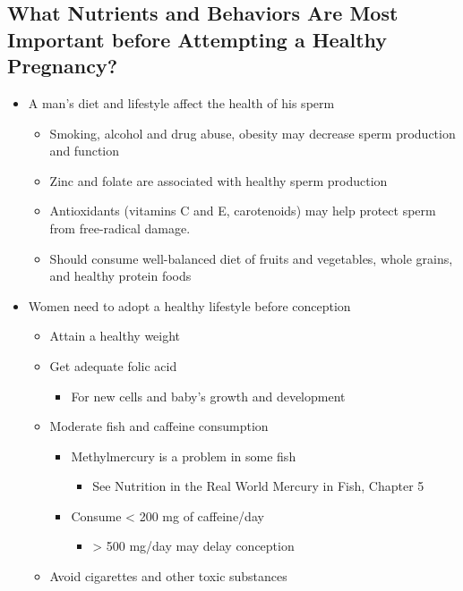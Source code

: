 \documentclass[12pt]{article}
\begin{document}
        \subsection{What Nutrients and Behaviors Are Most Important before Attempting a Healthy Pregnancy?}
            \begin{itemize}
                \item A man's diet and lifestyle affect the health of his sperm
                    \begin{itemize}
                        \item Smoking, alcohol and drug abuse, obesity may decrease sperm production and function
                        \item Zinc and folate are associated with healthy sperm production
                        \item Antioxidants (vitamins C and E, carotenoids) may help protect sperm from free-radical damage.
                        \item Should consume well-balanced diet of fruits and vegetables, whole grains, and healthy protein foods
                    \end{itemize}
                \item Women need to adopt a healthy lifestyle before conception
                    \begin{itemize}
                        \item Attain a healthy weight
                        \item Get adequate folic acid
                            \begin{itemize}
                                \item For new cells and baby's growth and development
                            \end{itemize}
                        \item Moderate fish and caffeine consumption
                            \begin{itemize}
                                \item Methylmercury is a problem in some fish
                                    \begin{itemize}
                                        \item See Nutrition in the Real World Mercury in Fish, Chapter 5
                                    \end{itemize}
                                \item Consume < 200 mg of caffeine/day
                                    \begin{itemize}
                                        \item > 500 mg/day may delay conception
                                    \end{itemize}
                            \end{itemize}
                        \item Avoid cigarettes and other toxic substances
                    \end{itemize}
            \end{itemize}
\end{document}
